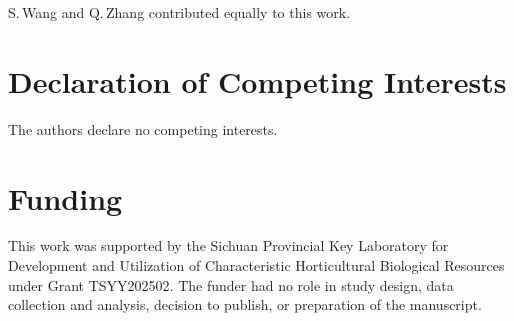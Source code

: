 \documentclass[fleqn,10pt]{wlscirep}
\begin{document}
\vspace{0.5em}
\noindent S.\,Wang and Q.\,Zhang contributed equally to this work.


\section*{Declaration of Competing Interests}

The authors declare no competing interests.

\section*{Funding}

This work was supported by the Sichuan Provincial Key Laboratory for Development and Utilization of Characteristic Horticultural Biological Resources under Grant TSYY202502. The funder had no role in study design, data collection and analysis, decision to publish, or preparation of the manuscript.


\end{document}
